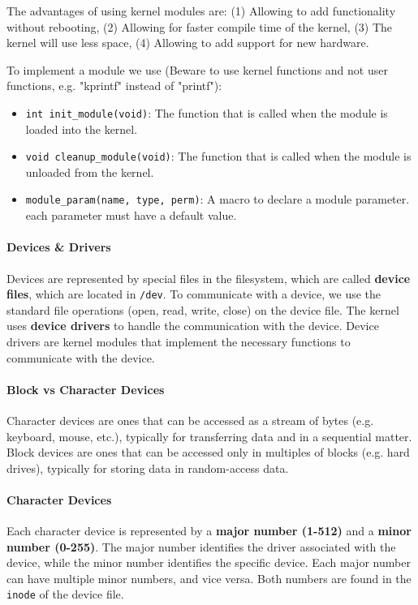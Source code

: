 \documentclass[openany,12pt]{book}
\newcommand{\code}[1]{\texttt{#1}}
\begin{document}
The advantages of using kernel modules are: (1) Allowing to add functionality without rebooting, (2) Allowing for faster compile time of the kernel, (3) The kernel will use less space, (4) Allowing to add support for new hardware.


To implement a module we use (Beware to use kernel functions and not user functions, e.g. "kprintf" instead of "printf"):
\begin{itemize}
  \item \code{int init\_module(void)}: The function that is called when the module is loaded into the kernel. 

  \item \code{void cleanup\_module(void)}: The function that is called when the module is unloaded from the kernel.

  \item \code{module\_param(name, type, perm)}: A macro to declare a module parameter. each parameter must have a default value.
\end{itemize}



\paragraph{Devices \& Drivers} Devices are represented by special files in the filesystem, which are called \textbf{device files}, which are located in \code{/dev}. To communicate with a device, we use the standard file operations (open, read, write, close) on the device file. The kernel uses \textbf{device drivers} to handle the communication with the device. Device drivers are kernel modules that implement the necessary functions to communicate with the device.

\paragraph{Block vs Character Devices} Character devices are ones that can be accessed as a stream of bytes (e.g. keyboard, mouse, etc.), typically for transferring data and in a sequential matter. Block devices are ones that can be accessed only in multiples of blocks (e.g. hard drives), typically for storing data in random-access data.

\paragraph{Character Devices} Each character device is represented by a \textbf{major number (1-512)} and a \textbf{minor number (0-255)}. The major number identifies the driver associated with the device, while the minor number identifies the specific device. Each major number can have multiple minor numbers, and vice versa. Both numbers are found in the \code{inode} of the device file.
\end{document}

